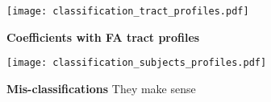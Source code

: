 \begin{figure}[!h]
    \centering
    \texttt{[image: classification\_tract\_profiles.pdf]}
    \caption{{\bf Coefficients with FA tract profiles}
       }
    \label{fig:class-profiles}
\end{figure}


\begin{figure}[!h]
    \centering
        \texttt{[image: classification\_subjects\_profiles.pdf]}
    \caption{{\bf Mis-classifications}
       They make sense}
    \label{fig:class-errors}
\end{figure}
